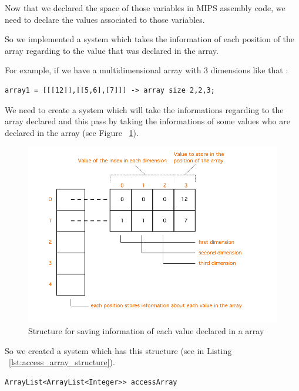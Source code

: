 \documentclass[
  oneside,
  11pt, a4paper,
  footinclude=true,
  headinclude=true,
  cleardoublepage=empty
]{scrbook}
\begin{document}
Now that we declared the space of those variables in MIPS assembly code, we need to declare the values associated to those variables.

So we implemented a system which takes the information of each position of the array regarding to the value that was declared in the array.

For example, if we have a multidimensional array with 3 dimensions like that :

\begin{lstlisting}[caption={Example of an array with 3 dimensions},label={lst:array_with_3_dimension_example}]
  array1 = [[[12]],[[5,6],[7]]] -> array size 2,2,3;
\end{lstlisting}

We need to create a system which will take the informations regarding to the array declared and this pass by taking the informations of some values who are declared in the array (see Figure ~\ref{fig:access_array_structure}).

\begin{figure}[h!]
  \centering
    \includegraphics[width=1\textwidth]{img/access_array.png}
    \caption{Structure for saving information of each value declared in a array}
    \label{fig:access_array_structure}
\end{figure}

So we created a system which has this structure (see in Listing ~\ref{lst:access_array_structure}).

\begin{lstlisting}[caption={Structure of saving informations of each index in JAVA},label={lst:access_array_structure}]
  ArrayList<ArrayList<Integer>> accessArray
\end{lstlisting}
\end{document}
